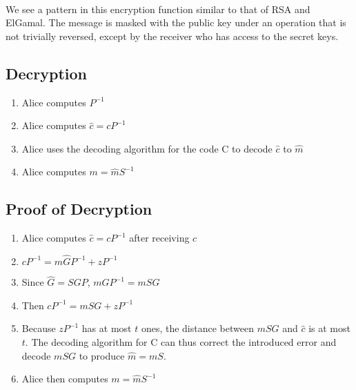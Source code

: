 \documentclass{article}
\theoremstyle{definition}
\begin{document}
	\paragraph{} We see a pattern in this encryption function similar to that of RSA and ElGamal.  The message is masked with the public key under an operation that is not trivially reversed, except by the receiver who has access to the secret keys.
	
	\subsection{Decryption}
	\begin{enumerate}[1)]
	\item Alice computes $P^{-1}$
	\item Alice computes ${\hat c} = cP^{-1}$
	\item Alice uses the decoding algorithm for the code C to decode ${\hat c}$ to ${\hat m}$
	\item Alice computes $m = {\hat m}S^{-1}$
	\end{enumerate}

	\subsection{Proof of Decryption}
	\begin{enumerate}
	\item Alice computes ${\hat c} = cP^{-1}$ after receiving $c$
	\item $cP^{-1} = m{\hat G}P^{-1} + zP^{-1}$
	\item Since ${\hat G} = SGP$, $m{\hat G}P^{-1} = mSG$
	\item Then $cP^{-1} = mSG + zP^{-1}$ 
	\item Because $zP^{-1}$ has at most $t$ ones, the distance between $mSG$ and ${\hat c}$ is at most $t$.  The decoding algorithm for C can thus correct the introduced error and decode $mSG$ to produce ${\hat m} = mS$.
	\item Alice then computes $m = {\hat m}S^{-1}$
	
	
	
	\end{enumerate}
\end{document}
